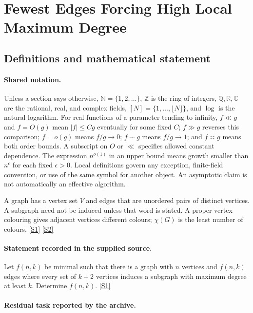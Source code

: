 \documentclass[11pt,a4paper]{article}
\newcommand{\N}{\mathbb{N}}
\newcommand{\Z}{\mathbb{Z}}
\newcommand{\Q}{\mathbb{Q}}
\newcommand{\R}{\mathbb{R}}
\newcommand{\C}{\mathbb{C}}
\newcommand{\sref}[2]{\hyperlink{source:#1:#2}{[S#2]}}
\begin{document}
\section{Fewest Edges Forcing High Local Maximum Degree}\label{statement}


\subsection{Definitions and mathematical statement}

\paragraph{Shared notation.}Unless a section says otherwise, $\N=\{1,2,\ldots\}$,
$\Z$ is the ring of integers, $\Q,\R,\C$ are the rational, real, and complex
fields, $[N]=\{1,\ldots,\lfloor N\rfloor\}$, and $\log$ is the natural
logarithm. For real functions of a parameter tending to infinity,
$f\ll g$ and $f=O(g)$ mean $|f|\leq Cg$ eventually for some fixed $C$;
$f\gg g$ reverses this comparison; $f=o(g)$ means $f/g\to0$;
$f\sim g$ means $f/g\to1$; and $f\asymp g$ means both order bounds.
A subscript on $O$ or $\ll$ specifies allowed constant dependence.
The expression $n^{o(1)}$ in an upper bound means growth smaller than
$n^\epsilon$ for each fixed $\epsilon>0$. Local definitions govern any
exception, finite-field convention, or use of the same symbol for another
object. An asymptotic claim is not automatically an effective algorithm.



A graph has a vertex set $V$ and edges that are unordered pairs of distinct vertices. A subgraph need not be induced unless that word is stated. A proper vertex colouring gives adjacent vertices different colours; $\chi(G)$ is the least number of colours. \sref{statement}{1} \sref{statement}{2}

\paragraph{Statement recorded in the supplied source.}
Let $f(n,k)$ be minimal such that there is a graph with $n$ vertices and $f(n,k)$ edges where every set of $k+2$ vertices induces a subgraph with maximum degree at least $k$. Determine $f(n,k)$. \sref{statement}{1}

\paragraph{Residual task reported by the archive.}
\end{document}
